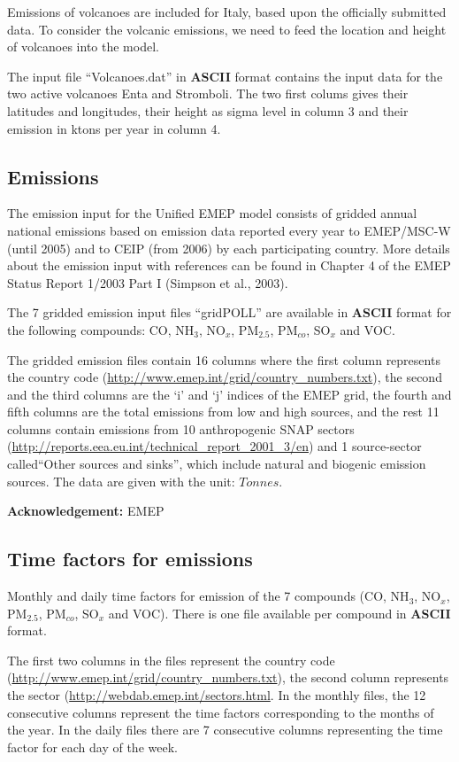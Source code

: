 Emissions of volcanoes are included for Italy, based upon the
officially submitted data.
To consider the volcanic emissions, we need to feed the location
and height of volcanoes into the model. 

The input file ``Volcanoes.dat'' in {\bf ASCII} format contains the input data for the two active volcanoes
 Enta and Stromboli. The two first colums gives their latitudes and longitudes, their height as sigma level
 in column 3 and their emission in ktons per year in column 4. 

\subsection{Emissions}
The emission input for the Unified EMEP model consists of gridded
annual national emissions based on emission data reported every year
to EMEP/MSC-W (until 2005) 
and to CEIP (from 2006) by each
participating country. 
More details about the emission input with references can be
found in Chapter 4 of the EMEP Status Report 1/2003 Part I 
(Simpson et al., 2003).

The 7 gridded emission input files ``gridPOLL'' are available in 
{\bf ASCII} format for the following compounds: CO, NH$_{3}$,
NO$_{x}$, PM$_{2.5}$, PM$_{co}$, SO$_{x}$ and VOC.

The gridded emission files contain 16 columns where the first column 
represents the country code
(\url{http://www.emep.int/grid/country_numbers.txt}), 
the second and the third columns are the `i' and `j' indices of the
EMEP grid, the fourth and fifth columns are the total emissions from
low and high sources, and the rest 11 columns contain emissions from 
10 anthropogenic SNAP sectors 
(\url{http://reports.eea.eu.int/technical_report_2001_3/en}) and 1 
source-sector called``Other sources and sinks'', which include natural and
biogenic emission sources. The data are given with the unit: $Tonnes$.

{\bf Acknowledgement:} EMEP

\subsection{Time factors for emissions}

Monthly and daily time factors for emission of the 7 compounds 
(CO, NH$_{3}$, NO$_{x}$, PM$_{2.5}$, PM$_{co}$, SO$_{x}$ and VOC). 
There is one file available per compound in {\bf ASCII} format. 

The first two columns in the files represent the country code
(\url{http://www.emep.int/grid/country_numbers.txt}), the second column 
represents the sector (\url{http://webdab.emep.int/sectors.html}. In the monthly files, 
the 12 consecutive columns represent the time factors corresponding to 
the months of the year. In the daily files there are 7 consecutive columns representing 
the time factor for each day of the week. 

